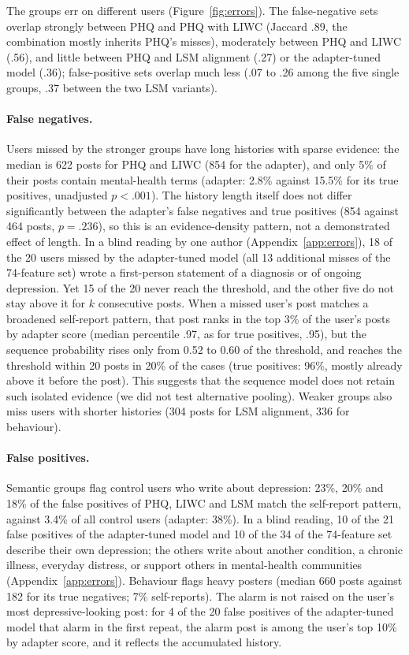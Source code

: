 \documentclass[11pt]{article}
\begin{document}
The groups err on different users (Figure~\ref{fig:errors}).
The false-negative sets overlap strongly between PHQ and PHQ with LIWC (Jaccard .89, the combination mostly inherits PHQ's misses), moderately between PHQ and LIWC (.56), and little between PHQ and LSM alignment (.27) or the adapter-tuned model (.36); false-positive sets overlap much less (.07 to .26 among the five single groups, .37 between the two LSM variants).

\paragraph{False negatives.}
Users missed by the stronger groups have long histories with sparse evidence: the median is 622 posts for PHQ and LIWC (854 for the adapter), and only 5\% of their posts contain mental-health terms (adapter: 2.8\% against 15.5\% for its true positives, unadjusted $p<.001$).
The history length itself does not differ significantly between the adapter's false negatives and true positives (854 against 464 posts, $p=.236$), so this is an evidence-density pattern, not a demonstrated effect of length.
In a blind reading by one author (Appendix~\ref{app:errors}), 18 of the 20 users missed by the adapter-tuned model (all 13 additional misses of the 74-feature set) wrote a first-person statement of a diagnosis or of ongoing depression.
Yet 15 of the 20 never reach the threshold, and the other five do not stay above it for $k$ consecutive posts.
When a missed user's post matches a broadened self-report pattern, that post ranks in the top 3\% of the user's posts by adapter score (median percentile .97, as for true positives, .95), but the sequence probability rises only from 0.52 to 0.60 of the threshold, and reaches the threshold within 20 posts in 20\% of the cases (true positives: 96\%, mostly already above it before the post).
This suggests that the sequence model does not retain such isolated evidence (we did not test alternative pooling).
Weaker groups also miss users with shorter histories (304 posts for LSM alignment, 336 for behaviour).

\paragraph{False positives.}
Semantic groups flag control users who write about depression: 23\%, 20\% and 18\% of the false positives of PHQ, LIWC and LSM match the self-report pattern, against 3.4\% of all control users (adapter: 38\%).
In a blind reading, 10 of the 21 false positives of the adapter-tuned model and 10 of the 34 of the 74-feature set describe their own depression; the others write about another condition, a chronic illness, everyday distress, or support others in mental-health communities (Appendix~\ref{app:errors}).
Behaviour flags heavy posters (median 660 posts against 182 for its true negatives; 7\% self-reports).
The alarm is not raised on the user's most depressive-looking post: for 4 of the 20 false positives of the adapter-tuned model that alarm in the first repeat, the alarm post is among the user's top 10\% by adapter score, and it reflects the accumulated history.
\end{document}
